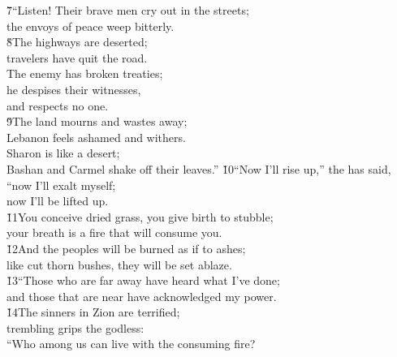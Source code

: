 \begin{poetry}
\poeml \v{7}``Listen! Their brave men cry out in the streets; \\
\poemll    the envoys of peace weep bitterly. \\
\poeml \v{8}The highways are deserted; \\
\poemll    travelers have quit the road. \\
\poeml The enemy has broken treaties; \\
\poemll    he despises their witnesses, \\
\poemlll       and respects no one. \\
\poeml \v{9}The land mourns and wastes away; \\
\poemll    Lebanon feels ashamed and withers. \\
\poeml Sharon is like a desert; \\
\poemll    Bashan and Carmel shake off their leaves.''
\poeml \v{10}``Now I'll rise up,'' the  has said, \\
\poemll    ``now I'll exalt myself; \\
\poemlll       now I'll be lifted up. \\
\poeml \v{11}You conceive dried grass, you give birth to stubble; \\
\poemll    your breath is a fire that will consume you. \\
\poeml \v{12}And the peoples will be burned as if to ashes; \\
\poemll    like cut thorn bushes, they will be set ablaze. \\
\poeml \v{13}``Those who are far away have heard what I've done; \\
\poemll    and those that are near have acknowledged my power. \\
\poeml \v{14}The sinners in Zion are terrified; \\
\poemll    trembling grips the godless: \\
\poeml ``Who among us can live with the consuming fire? \\

\end{poetry}
